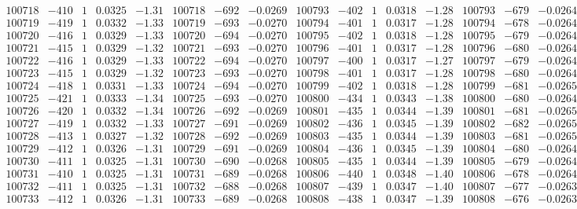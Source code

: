 \documentclass[11pt,reqno,a4letter]{article}
\numberwithin{figure}{section}
\numberwithin{table}{section}
\theoremstyle{plain}
\numberwithin{theorem}{section}
\theoremstyle{definition}
\begin{document}
\begin{table}[ht!]
\begin{equation*}
{\begin{array}{ccccc|ccc||ccccc|ccc}
100718 & -410 & 1 & 0.0325 & -1.31 & 100718 & -692 & -0.0269 & 100793 & -402 & 1 & 0.0318 & -1.28 & 100793 & -679 & -0.0264  \\
100719 & -419 & 1 & 0.0332 & -1.33 & 100719 & -693 & -0.0270 & 100794 & -401 & 1 & 0.0317 & -1.28 & 100794 & -678 & -0.0264  \\
100720 & -416 & 1 & 0.0329 & -1.33 & 100720 & -694 & -0.0270 & 100795 & -402 & 1 & 0.0318 & -1.28 & 100795 & -679 & -0.0264  \\
100721 & -415 & 1 & 0.0329 & -1.32 & 100721 & -693 & -0.0270 & 100796 & -401 & 1 & 0.0317 & -1.28 & 100796 & -680 & -0.0264  \\
100722 & -416 & 1 & 0.0329 & -1.33 & 100722 & -694 & -0.0270 & 100797 & -400 & 1 & 0.0317 & -1.27 & 100797 & -679 & -0.0264  \\
100723 & -415 & 1 & 0.0329 & -1.32 & 100723 & -693 & -0.0270 & 100798 & -401 & 1 & 0.0317 & -1.28 & 100798 & -680 & -0.0264  \\
100724 & -418 & 1 & 0.0331 & -1.33 & 100724 & -694 & -0.0270 & 100799 & -402 & 1 & 0.0318 & -1.28 & 100799 & -681 & -0.0265  \\
100725 & -421 & 1 & 0.0333 & -1.34 & 100725 & -693 & -0.0270 & 100800 & -434 & 1 & 0.0343 & -1.38 & 100800 & -680 & -0.0264  \\
100726 & -420 & 1 & 0.0332 & -1.34 & 100726 & -692 & -0.0269 & 100801 & -435 & 1 & 0.0344 & -1.39 & 100801 & -681 & -0.0265  \\
100727 & -419 & 1 & 0.0332 & -1.33 & 100727 & -691 & -0.0269 & 100802 & -436 & 1 & 0.0345 & -1.39 & 100802 & -682 & -0.0265  \\
100728 & -413 & 1 & 0.0327 & -1.32 & 100728 & -692 & -0.0269 & 100803 & -435 & 1 & 0.0344 & -1.39 & 100803 & -681 & -0.0265  \\
100729 & -412 & 1 & 0.0326 & -1.31 & 100729 & -691 & -0.0269 & 100804 & -436 & 1 & 0.0345 & -1.39 & 100804 & -680 & -0.0264  \\
100730 & -411 & 1 & 0.0325 & -1.31 & 100730 & -690 & -0.0268 & 100805 & -435 & 1 & 0.0344 & -1.39 & 100805 & -679 & -0.0264  \\
100731 & -410 & 1 & 0.0325 & -1.31 & 100731 & -689 & -0.0268 & 100806 & -440 & 1 & 0.0348 & -1.40 & 100806 & -678 & -0.0264  \\
100732 & -411 & 1 & 0.0325 & -1.31 & 100732 & -688 & -0.0268 & 100807 & -439 & 1 & 0.0347 & -1.40 & 100807 & -677 & -0.0263  \\
100733 & -412 & 1 & 0.0326 & -1.31 & 100733 & -689 & -0.0268 & 100808 & -438 & 1 & 0.0347 & -1.39 & 100808 & -676 & -0.0263  \\

\end{array}}
\end{equation*}
\end{table}
\end{document}
